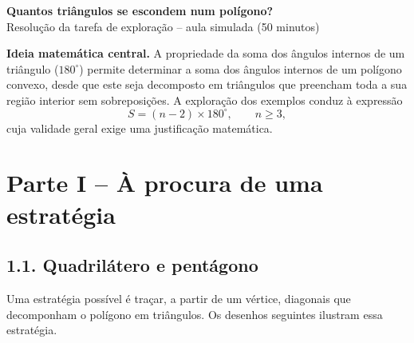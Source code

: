\begingroup
\small
\setlength{\parskip}{2pt}
\setlength{\abovedisplayskip}{5pt}
\setlength{\belowdisplayskip}{5pt}
\begin{center}
{\Large\bfseries\color{azulPDMI}
Quantos triângulos se escondem num polígono?}\\[3pt]
{\small Resolução da tarefa de exploração -- aula simulada (50 minutos)}
\end{center}

\begin{tcolorbox}[
colback=azulClaro,colframe=azulPDMI!40,boxrule=.5pt,
arc=2mm,left=8pt,right=8pt,top=6pt,bottom=6pt]
\textbf{Ideia matemática central.}
A propriedade da soma dos ângulos internos de um triângulo
($180^\circ$) permite determinar a soma dos ângulos internos de um
polígono convexo, desde que este seja decomposto em triângulos que
preencham toda a sua região interior sem sobreposições.
A exploração dos exemplos conduz à expressão
\[
\boxed{S=(n-2)\times180^\circ,\qquad n\geq3,}
\]
cuja validade geral exige uma justificação matemática.
\end{tcolorbox}

\section*{Parte I -- À procura de uma estratégia}

\subsection*{1.1. Quadrilátero e pentágono}

Uma estratégia possível é traçar, a partir de um vértice, diagonais
que decomponham o polígono em triângulos. Os desenhos seguintes
ilustram essa estratégia.

